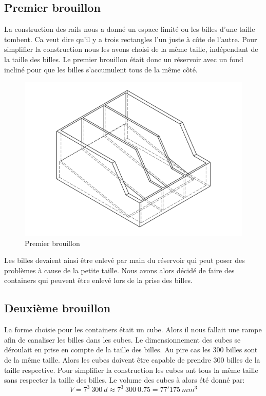 \subsection{Premier brouillon}
La construction des rails nous a donné un espace limité ou les billes d'une taille tombent. Ca veut dire qu'il y a trois rectangles l'un juste à côte de l'autre. Pour simplifier la construction nous les avons choisi de la même taille, indépendant de la taille des billes. Le premier brouillon était donc un réservoir avec un fond incliné pour que les billes s'accumulent tous de la même côté.

\begin{figure}
    \centering
    \includegraphics[width=\textwidth]{Graphics/Reservoir_final/PREMIER_BROUILLON.pdf}
    \caption{Premier brouillon}
\end{figure}

Les billes devaient ainsi être enlevé par main du réservoir qui peut poser des problèmes à cause de la petite taille. Nous avons alors décidé de faire des containers qui peuvent être enlevé lors de la prise des billes. 

\subsection{Deuxième brouillon}
La forme choisie pour les containers était un cube. Alors il nous fallait une rampe afin de canaliser les billes dans les cubes.  Le dimensionnement des cubes se déroulait en prise en compte de la taille des billes. Au pire cas les 300 billes sont de la même taille. Alors les cubes doivent être capable de prendre 300 billes de la taille respective. Pour simplifier la construction les cubes ont tous la même taille sans respecter la taille des billes. Le volume des cubes à alors été donné par:
\begin{equation}
    V = 7^3\ 300\ d \approx 7^3\ 300\ 0.75 = 77'175\ mm^3
    \label{eq:volumereservoirfin}
\end{equation}

